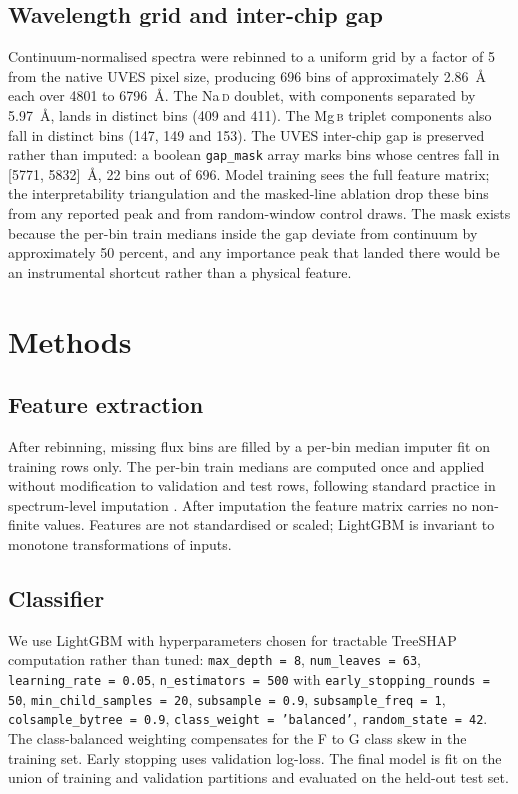 \documentclass[11pt,a4paper]{article}
\newcommand{\Mgb}{Mg\,\textsc{b}\xspace}
\newcommand{\NaD}{Na\,\textsc{d}\xspace}
\begin{document}
\subsection{Wavelength grid and inter-chip gap}
\label{subsec:wavelength-grid}

Continuum-normalised spectra were rebinned to a uniform grid by a factor of 5 from the native UVES pixel size, producing 696 bins of approximately 2.86~\AA{} each over 4801 to 6796~\AA{}. The \NaD doublet, with components separated by 5.97~\AA{}, lands in distinct bins (409 and 411). The \Mgb triplet components also fall in distinct bins (147, 149 and 153). The UVES inter-chip gap is preserved rather than imputed: a boolean \texttt{gap\_mask} array marks bins whose centres fall in [5771, 5832]~\AA{}, 22 bins out of 696. Model training sees the full feature matrix; the interpretability triangulation and the masked-line ablation drop these bins from any reported peak and from random-window control draws. The mask exists because the per-bin train medians inside the gap deviate from continuum by approximately 50 percent, and any importance peak that landed there would be an instrumental shortcut rather than a physical feature.

\section{Methods}
\label{sec:methods}

\subsection{Feature extraction}

After rebinning, missing flux bins are filled by a per-bin median imputer fit on training rows only. The per-bin train medians are computed once and applied without modification to validation and test rows, following standard practice in spectrum-level imputation \citep{2015ApJ...808...16N,2018MNRAS.475.2978F}. After imputation the feature matrix carries no non-finite values. Features are not standardised or scaled; LightGBM is invariant to monotone transformations of inputs.

\subsection{Classifier}

\begin{sloppypar}
We use LightGBM \citep{Ke2017LightGBM} with hyperparameters chosen for tractable TreeSHAP computation rather than tuned: \texttt{max\_depth = 8}, \texttt{num\_leaves = 63}, \texttt{learning\_rate = 0.05}, \texttt{n\_estimators = 500} with \texttt{early\_stopping\_rounds = 50}, \texttt{min\_child\_samples = 20}, \texttt{subsample = 0.9}, \texttt{subsample\_freq = 1}, \texttt{colsample\_bytree = 0.9}, \texttt{class\_weight = 'balanced'}, \texttt{random\_state = 42}. The class-balanced weighting compensates for the F to G class skew in the training set. Early stopping uses validation log-loss. The final model is fit on the union of training and validation partitions and evaluated on the held-out test set.
\end{sloppypar}
\end{document}
